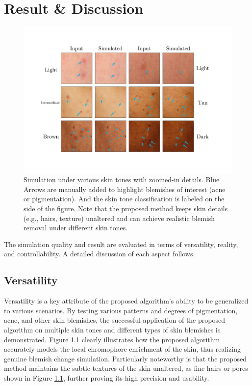 
\chapter{Result \& Discussion}
\begin{spacing}{1.5}
\setlength{\parskip}{0.3in}
\begin{figure}[h]
    \centering
    \includegraphics[width=\columnwidth]{Chapter5/img_comp6.pdf}
    \caption{Simulation under various skin tones with zoomed-in details. Blue Arrows are manually added to highlight blemishes of interest (acne or pigmentation). And the skin tone classification is labeled on the side of the figure. Note that the proposed method keeps skin details (e.g., hairs, texture) unaltered and can achieve realistic blemish removal under different skin tones.}
    \label{fig:sim1}
\end{figure}
The simulation quality and result are evaluated in terms of versatility, reality, and controllability. A detailed discussion of each aspect follows.
\section{Versatility}
Versatility is a key attribute of the proposed algorithm's ability to be generalized to various scenarios. By testing various patterns and degrees of pigmentation, acne, and other skin blemishes, the successful application of the proposed algorithm on multiple skin tones and different types of skin blemishes is demonstrated. Figure \ref{fig:sim1} clearly illustrates how the proposed algorithm accurately models the local chromophore enrichment of the skin, thus realizing genuine blemish change simulation. Particularly noteworthy is that the proposed method maintains the subtle textures of the skin unaltered, as fine hairs or pores shown in Figure \ref{fig:sim1}, further proving its high precision and usability.


\end{spacing}
